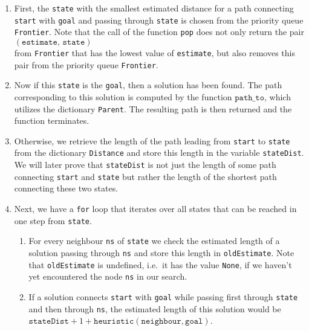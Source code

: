 \begin{enumerate}
\item First, the \texttt{state} with the smallest estimated distance for a path connecting \texttt{start}
      with \texttt{goal} and passing through \texttt{state} is chosen from the priority queue 
      \texttt{Frontier}.  Note that the call of the function \texttt{pop} does not only return the pair
      \\[0.2cm]
      \hspace*{1.3cm}
      $(\mathtt{estimate},\, \mathtt{state})$
      \\[0.2cm]
      from \texttt{Frontier} that has the lowest value of \texttt{estimate}, but also removes this
      pair from the priority queue \texttt{Frontier}.
\item Now if this \texttt{state} is the \texttt{goal}, then a solution has been found.  The path
      corresponding to this solution is computed by the function $\texttt{path\_to}$, which utilizes 
      the dictionary \texttt{Parent}.  The resulting path is then returned and the function terminates.
\item Otherwise, we retrieve the length of the path leading from \texttt{start} to \texttt{state} from the
      dictionary \texttt{Distance} and store this length in the variable \texttt{stateDist}.  We will later
      prove that \texttt{stateDist} is not just the length of some path connecting
      \texttt{start} and \texttt{state} but rather the length of the shortest path connecting these
      two states. 
\item Next, we have a \texttt{for} loop that iterates over all states that can be reached in one step from 
      \texttt{state}.
      \begin{enumerate}
      \item For every neighbour \texttt{ns} of \texttt{state} we check the estimated length of a solution
            passing through \texttt{ns} and store this length in \texttt{oldEstimate}.   Note that
            \texttt{oldEstimate} is undefined, i.e.~it has the value \texttt{None}, if we haven't yet encountered the node
            \texttt{ns} in our search.
      \item If a solution connects \texttt{start} with \texttt{goal} while passing first through
            \texttt{state} and then through \texttt{ns}, the estimated length of this solution would be
            \\[0.2cm]
            \hspace*{1.3cm}
            $\mathtt{stateDist} + 1 + \mathtt{heuristic}(\mathtt{neighbour}, \mathtt{goal})$.

\end{enumerate}
\end{enumerate}
